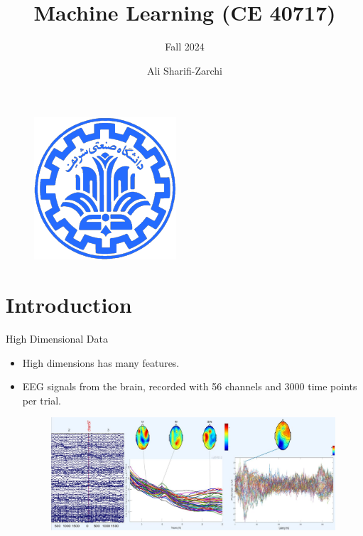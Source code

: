 \documentclass[serif, aspectratio=169]{beamer}
\author{Ali Sharifi-Zarchi}
\title{Machine Learning (CE 40717)}
\subtitle{Fall 2024}
\institute{
    CE Department \\
    Sharif University of Technology
}
\begin{document}
\begin{frame}
    \titlepage
    \vspace*{-0.6cm}
    \begin{figure}[htpb]
        \begin{center}
            \includegraphics[keepaspectratio, scale=0.25]{pic/sharif-main-logo.png}
        \end{center}
    \end{figure}
\end{frame}

\begin{frame}    
\tableofcontents[sectionstyle=show,
subsectionstyle=show/shaded/hide,
subsubsectionstyle=show/shaded/hide]
\end{frame}

\section{Introduction}

\begin{frame}{High Dimensional Data}
    \begin{itemize}
        \item High dimensions has many features.
        \item EEG signals from the brain, recorded with 56 channels and 3000 time points per trial.

        \begin{figure}[htpb]
            \begin{center}
                \includegraphics[keepaspectratio, scale=0.4]{pic/brain.JPG}
            \end{center}
        \end{figure}
    \end{itemize}
\end{frame}
\end{document}
